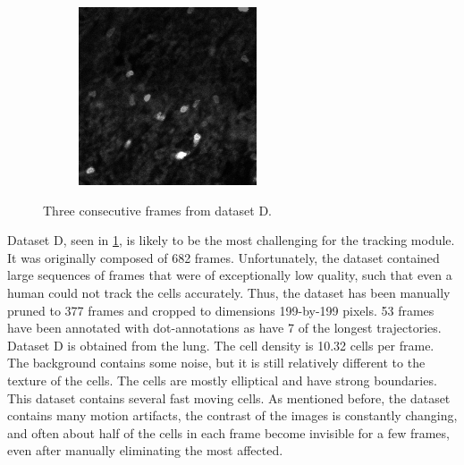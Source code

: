 \begin{figure}[h]
\begin{subfigure}{.32\textwidth}
		\end{subfigure}
		\hfill
		\begin{subfigure}{.32\textwidth}
		\includegraphics[width=\textwidth]{images/series14croppedclean027}
		\end{subfigure}
		\caption{Three consecutive frames from dataset D.}
		\label{fig:data_datasetD}
	\end{figure}

 	Dataset D, seen in \cref{fig:data_datasetD}, is likely to be the most challenging for the tracking module. It was originally composed of 682 frames. Unfortunately, the dataset contained large sequences of frames that were of exceptionally low quality, such that even a human could not track the cells accurately. Thus, the dataset has been manually pruned to 377 frames and cropped to dimensions 199-by-199 pixels. 53 frames have been annotated with dot-annotations as have 7 of the longest trajectories. Dataset D is obtained from the lung. The cell density is 10.32 cells per frame. The background contains some noise, but it is still relatively different to the texture of the cells. The cells are mostly elliptical and have strong boundaries. This dataset contains several fast moving cells. As mentioned before, the dataset contains many motion artifacts, the contrast of the images is constantly changing, and often about half of the cells in each frame become invisible for a few frames, even after manually eliminating the most affected.
	
